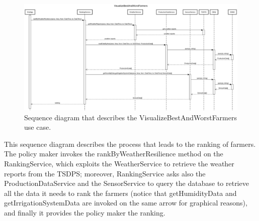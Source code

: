 \documentclass{article}
\begin{document}
\newpage
\begin{figure}[H]
   \centering
   \includegraphics[scale=0.20]{diagrams/sequence diagrams/VisualizeBestAndWorstFarmers.png}
    \caption{Sequence diagram that describes the VisualizeBestAndWorstFarmers use case.}
\end{figure}
This sequence diagram describes the process that leads to the ranking of farmers. The policy maker invokes the rankByWeatherResilience method on the RankingService, which exploits the WeatherService to retrieve the weather reports from the TSDPS; moreover, RankingService asks also the ProductionDataService and the SensorService to query the database to retrieve all the data it needs to rank the farmers (notice that getHumidityData and getIrrigationSystemData are invoked on the same arrow for graphical reasons), and finally it provides the policy maker the ranking.
\end{document}
